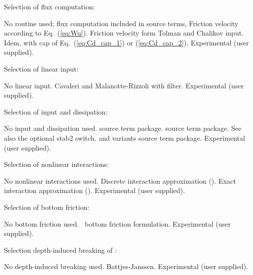 \noindent
Selection of flux computation:
\begin{slist}
 {No routine used; flux computation included in source terms,}
 {Friction velocity according to Eq.~(\ref{eq:Wu}).}
 {Friction velocity form Tolman and Chalikov input.}
 {Idem, with cap of Eq.~(\ref{eq:Cd_cap_1}) or (\ref{eq:Cd_cap_2}).}
 {Experimental (user supplied).}
\end{slist}

\noindent
Selection of linear input:
\begin{slist}
 {No linear input.}
 {Cavaleri and Malanotte-Rizzoli with filter.}
 {Experimental (user supplied).}
\end{slist}

\noindent
Selection of input and dissipation:
\begin{slist}
 {No input and dissipation used.}
 {\wam{} source term package.}
 {\cite{tol:JPO96} source term package. See also
          the optional {\sc stab2} switch.}
 {\wam{} and variants source term package.}
 {Experimental (user supplied).}
\end{slist}

\noindent
Selection of nonlinear interactions:
\begin{slist}
 {No nonlinear interactions used.}
 {Discrete interaction approximation (\dia).}
 {Exact interaction approximation (\xnl).}
 {Experimental (user supplied).}
\end{slist}

\noindent
Selection of bottom friction:
\begin{slist}
 {No bottom friction used.}
 {\js\ bottom friction formulation.}
 {Experimental (user supplied).}
\end{slist}

\noindent
Selection depth-induced breaking of :
\begin{slist}
 {No depth-induced breaking used.}
 {Battjes-Janssen.}
 {Experimental (user supplied).}
\end{slist}

